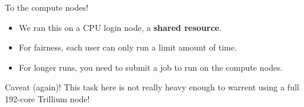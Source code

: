 \documentclass[
  10pt,
  ignorenonframetext,
  aspectratio=169,handout]{beamer}
\newenvironment{Shaded}{\begin{snugshade}}{\end{snugshade}}
\newcommand{\ExtensionTok}[1]{\textcolor[rgb]{0.80,0.80,0.80}{#1}}
\newcommand{\KeywordTok}[1]{\textcolor[rgb]{0.94,0.87,0.69}{#1}}
\newcommand{\NormalTok}[1]{\textcolor[rgb]{0.80,0.80,0.80}{#1}}
\begin{document}
\begin{frame}[fragile]{To the compute nodes!}
\label{to-the-compute-nodes}
\begin{Shaded}
\end{Shaded}

\begin{itemize}
\item
  We ran this on a CPU login node, a \textbf{shared resource}.
\item
  For fairness, each user can only run a limit amount of time.

  \pause
\item
  For longer runs, you need to submit a job to run on the compute nodes.

  \pause
\end{itemize}

\alert{Caveat (again)! This task here is not really heavy enough to warrent using a full 192-core Trillium node!}
\end{frame}
\end{document}
